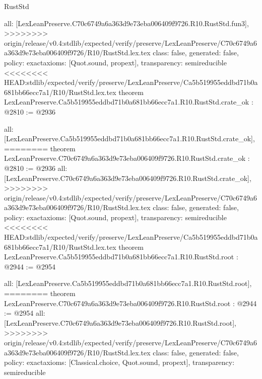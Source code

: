 \begin{lexlean}{RustStd}
\begin{coremodule}
{\begin{coremodule}
{{{{{{{  all: [LexLeanPreserve.C70c6749a6a363d9e73eba006409f9726.R10.RustStd.fun3],
>>>>>>>> origin/release/v0.4:stdlib/expected/verify/preserve/LexLeanPreserve/C70c6749a6a363d9e73eba006409f9726/R10/RustStd.lex.tex
  class: false,
  generated: false,
  policy: exact{axioms: [Quot.sound, propext]},
  transparency: semireducible
}
<<<<<<<< HEAD:stdlib/expected/verify/preserve/LexLeanPreserve/Ca5b519955eddbd71b0a681bb66ecc7a1/R10/RustStd.lex.tex
theorem LexLeanPreserve.Ca5b519955eddbd71b0a681bb66ecc7a1.R10.RustStd.crate_ok : @2810 := @2936 {
  all: [LexLeanPreserve.Ca5b519955eddbd71b0a681bb66ecc7a1.R10.RustStd.crate_ok],
========
theorem LexLeanPreserve.C70c6749a6a363d9e73eba006409f9726.R10.RustStd.crate_ok : @2810 := @2936 {
  all: [LexLeanPreserve.C70c6749a6a363d9e73eba006409f9726.R10.RustStd.crate_ok],
>>>>>>>> origin/release/v0.4:stdlib/expected/verify/preserve/LexLeanPreserve/C70c6749a6a363d9e73eba006409f9726/R10/RustStd.lex.tex
  class: false,
  generated: false,
  policy: exact{axioms: [Quot.sound, propext]},
  transparency: semireducible
}
<<<<<<<< HEAD:stdlib/expected/verify/preserve/LexLeanPreserve/Ca5b519955eddbd71b0a681bb66ecc7a1/R10/RustStd.lex.tex
theorem LexLeanPreserve.Ca5b519955eddbd71b0a681bb66ecc7a1.R10.RustStd.root : @2944 := @2954 {
  all: [LexLeanPreserve.Ca5b519955eddbd71b0a681bb66ecc7a1.R10.RustStd.root],
========
theorem LexLeanPreserve.C70c6749a6a363d9e73eba006409f9726.R10.RustStd.root : @2944 := @2954 {
  all: [LexLeanPreserve.C70c6749a6a363d9e73eba006409f9726.R10.RustStd.root],
>>>>>>>> origin/release/v0.4:stdlib/expected/verify/preserve/LexLeanPreserve/C70c6749a6a363d9e73eba006409f9726/R10/RustStd.lex.tex
  class: false,
  generated: false,
  policy: exact{axioms: [Classical.choice, Quot.sound, propext]},
  transparency: semireducible
}

}}}}}}}}
\end{coremodule}}
\end{coremodule}
\end{lexlean}
